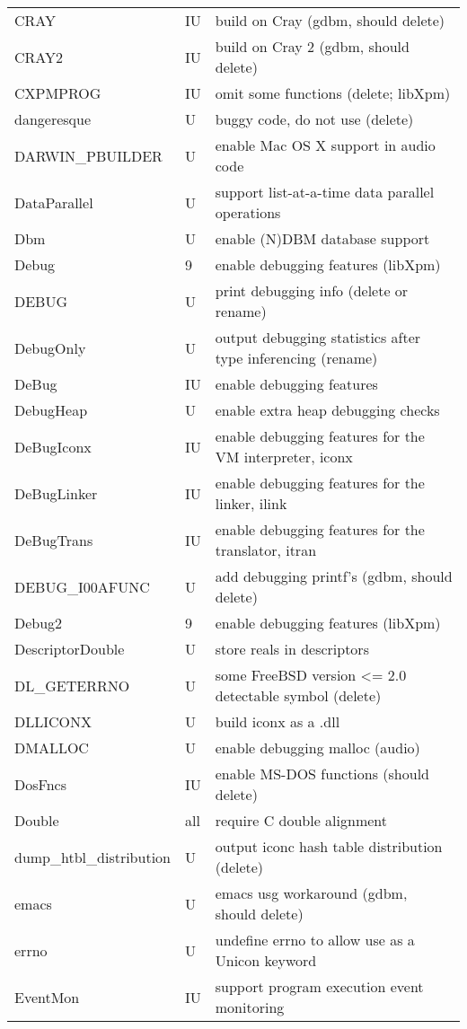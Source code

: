 \begin{xtabular}{|m{1.8in}|m{0.5in}|m{4.0in}|}
CRAY & IU & build on Cray (gdbm, should delete) \\
CRAY2 & IU & build on Cray 2 (gdbm, should delete) \\
CXPMPROG & IU & omit some functions (delete; libXpm) \\
dangeresque & U & buggy code, do not use (delete) \\
DARWIN\_PBUILDER & U & enable Mac OS X support in audio code \\
DataParallel & U & support list-at-a-time data parallel operations \\
Dbm & U & enable (N)DBM database support \\
Debug & 9 & enable debugging features (libXpm) \\
DEBUG & U & print debugging info (delete or rename) \\
DebugOnly & U & output debugging statistics after type inferencing (rename) \\
DeBug & IU & enable debugging features \\
DebugHeap & U & enable extra heap debugging checks \\
DeBugIconx & IU & enable debugging features for the VM interpreter, iconx \\
DeBugLinker & IU & enable debugging features for the linker, ilink \\
DeBugTrans & IU & enable debugging features for the translator, itran \\
DEBUG\_I00AFUNC & U & add debugging printf's (gdbm, should delete) \\
Debug2 & 9 & enable debugging features (libXpm) \\
DescriptorDouble & U & store reals in descriptors \\
DL\_GETERRNO & U & some FreeBSD version <= 2.0 detectable symbol (delete) \\
DLLICONX & U & build iconx as a .dll \\
DMALLOC & U & enable debugging malloc (audio) \\
DosFncs & IU & enable MS-DOS functions (should delete) \\
Double & all & require C double alignment \\
dump\_htbl\_distribution & U & output iconc hash table distribution (delete) \\
emacs & U & emacs usg workaround (gdbm, should delete) \\
errno & U & undefine errno to allow use as a Unicon keyword \\
EventMon & IU & support program execution event monitoring \\

\end{xtabular}
